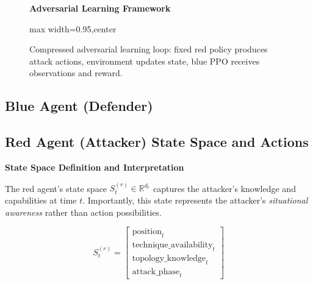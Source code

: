 \documentclass[12pt,oneside]{article}
\begin{document}
\begin{figure}[H]
\centering
\textbf{Adversarial Learning Framework}
\medskip
\begin{adjustbox}{max width=0.95\linewidth,center}
\end{adjustbox}
\caption{Compressed adversarial learning loop: fixed red policy produces attack actions, environment updates state, blue PPO receives observations and reward.}
\label{fig:adversarial_framework}
\end{figure}

\subsection{Blue Agent (Defender)}

\subsection{Red Agent (Attacker) State Space and Actions}

\textbf{State Space Definition and Interpretation}

The red agent's state space $S^{(r)}_t \in \mathbb{R}^{d_r}$ captures the attacker's knowledge and capabilities at time $t$. Importantly, this state represents the attacker's \textit{situational awareness} rather than action possibilities.

\begin{equation}
S^{(r)}_t = \begin{bmatrix}
\text{position}_t \\
\text{technique\_availability}_t \\
\text{topology\_knowledge}_t \\
\text{attack\_phase}_t
\end{bmatrix}
\end{equation}
\end{document}
